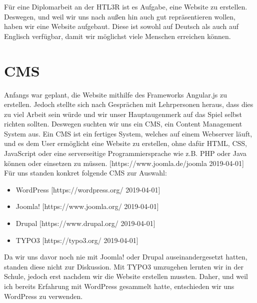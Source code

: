 Für eine Diplomarbeit an der HTL3R ist es Aufgabe, eine Website zu erstellen.
Deswegen, und weil wir uns nach außen hin auch gut repräsentieren wollen, haben wir eine Website aufgebaut.
Diese ist sowohl auf Deutsch als auch auf Englisch verfügbar, damit wir möglichst viele Menschen erreichen können.

\section{CMS}
Anfangs war geplant, die Website mithilfe des Frameworks Angular.js zu erstellen.
Jedoch stellte sich nach Gesprächen mit Lehrpersonen heraus, dass dies zu viel Arbeit sein würde und wir unser Hauptaugenmerk auf das Spiel selbst richten sollten.
Deswegen suchten wir uns ein CMS, ein Content Management System aus.
Ein CMS ist ein fertiges System, welches auf einem Webserver läuft, und es dem User ermöglicht eine Website zu erstellen, ohne dafür HTML, CSS, JavaScript oder eine serverseitige Programmiersprache wie z.B. PHP oder Java können oder einsetzen zu müssen. [https://www.joomla.de/joomla 2019-04-01]
Für uns standen konkret folgende CMS zur Auswahl:
\begin{itemize}
    \item WordPress [https://wordpress.org/ 2019-04-01]
    \item Joomla! [https://www.joomla.org/ 2019-04-01]
    \item Drupal [https://www.drupal.org/ 2019-04-01]
    \item TYPO3 [https://typo3.org/ 2019-04-01]
\end{itemize}
Da wir uns davor noch nie mit Joomla! oder Drupal auseinandergesetzt hatten, standen diese nicht zur Diskussion.
Mit TYPO3 umzugehen lernten wir in der Schule, jedoch erst nachdem wir die Website erstellen mussten.
Daher, und weil ich bereits Erfahrung mit WordPress gesammelt hatte, entschieden wir uns WordPress zu verwenden.

